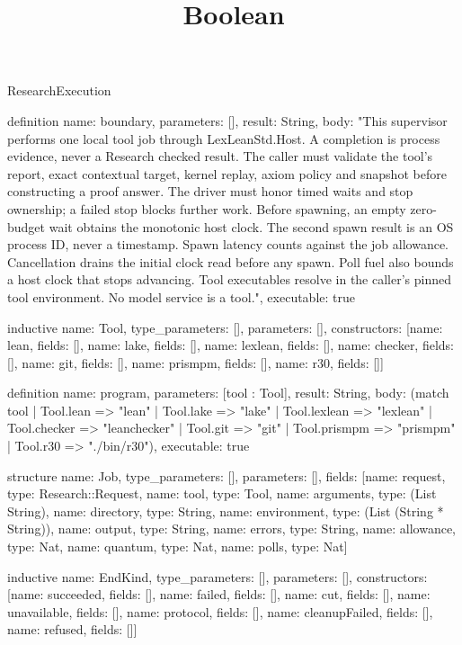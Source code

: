 \begin{lexlean}{ResearchExecution}
\title{Boolean}
\begin{semanticmodule}
definition{
  name: boundary,
  parameters: [],
  result: String,
  body: "This supervisor performs one local tool job through LexLeanStd.Host. A completion is process evidence, never a Research checked result. The caller must validate the tool's report, exact contextual target, kernel replay, axiom policy and snapshot before constructing a proof answer. The driver must honor timed waits and stop ownership; a failed stop blocks further work. Before spawning, an empty zero-budget wait obtains the monotonic host clock. The second spawn result is an OS process ID, never a timestamp. Spawn latency counts against the job allowance. Cancellation drains the initial clock read before any spawn. Poll fuel also bounds a host clock that stops advancing. Tool executables resolve in the caller's pinned tool environment. No model service is a tool.",
  executable: true
}

inductive{
  name: Tool,
  type_parameters: [],
  parameters: [],
  constructors: [{name: lean, fields: []}, {name: lake, fields: []}, {name: lexlean, fields: []}, {name: checker, fields: []}, {name: git, fields: []}, {name: prismpm, fields: []}, {name: r30, fields: []}]
}

definition{
  name: program,
  parameters: [tool : Tool],
  result: String,
  body: (match tool | Tool.lean => "lean" | Tool.lake => "lake" | Tool.lexlean => "lexlean" | Tool.checker => "leanchecker" | Tool.git => "git" | Tool.prismpm => "prismpm" | Tool.r30 => "./bin/r30"),
  executable: true
}

structure{
  name: Job,
  type_parameters: [],
  parameters: [],
  fields: [{name: request, type: Research::Request}, {name: tool, type: Tool}, {name: arguments, type: (List String)}, {name: directory, type: String}, {name: environment, type: (List (String * String))}, {name: output, type: String}, {name: errors, type: String}, {name: allowance, type: Nat}, {name: quantum, type: Nat}, {name: polls, type: Nat}]
}

inductive{
  name: EndKind,
  type_parameters: [],
  parameters: [],
  constructors: [{name: succeeded, fields: []}, {name: failed, fields: []}, {name: cut, fields: []}, {name: unavailable, fields: []}, {name: protocol, fields: []}, {name: cleanupFailed, fields: []}, {name: refused, fields: []}]
}


\end{semanticmodule}
\end{lexlean}
